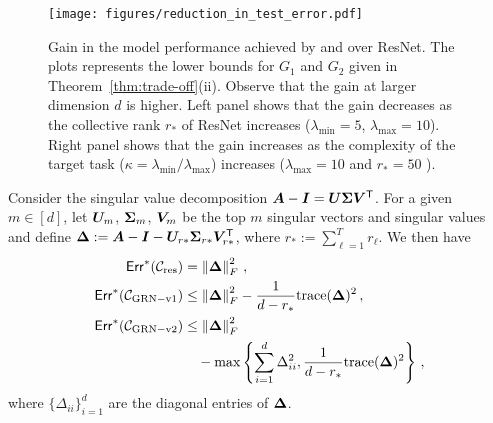  \begin{figure*}[t!]
    \centering
    \hspace{1cm} %
    \texttt{[image: figures/reduction\_in\_test\_error.pdf]}
    \vskip -0.1in
    \caption{Gain in the model performance achieved by \GenA{} and \GenB{} over ResNet. The plots represents the lower bounds for $G_1$ and $G_2$ given in Theorem~\ref{thm:trade-off}(ii). Observe that the gain at larger dimension $d$ is higher. Left panel shows that the gain decreases as the collective rank $r_*$ of ResNet increases ($\lambda_{\min}= 5$, $\lambda_{\max} = 10$). Right panel shows that the gain increases as the complexity of the target task ($\kappa= \lambda_{\min}/\lambda_{\max}$) increases ($\lambda_{\max}= 10$ and $r_* = 50$ ).}\label{fig:tradeoffs}
\end{figure*}

\begin{theorem}\label{thm:comp}
Consider the singular value decomposition ${\bm{A}}-\bm{I} = {\bm{U}}\boldsymbol{\Sigma} {\bm{V}}^{\sf T}$. For a given $m\in[d]$, let ${\bm{U}}_{m}$, $\boldsymbol{\Sigma}_m$, ${\bm{V}}_{m}$ be the top $m$ singular vectors and singular values and define $\bm{\Delta}: = {\bm{A}} -\bm{I}- {\bm{U}}_{r*}\boldsymbol{\Sigma}_{r*} {\bm{V}}_{r*}^{\sf T}$, where $r_*:=\sum_{\ell=1}^{T}r_\ell$.
We then have
\begin{align*}
    {\sf Err}^*(\mathcal{C}_{\rm res}) &= \left\|\bm{\Delta}\right\|_{F}^2\,,\\
    {\sf Err}^*(\mathcal{C}_{\rm GRN-v1{}}) &\le \left\|\bm{\Delta}\right\|_{F}^2 - \frac{1}{d-r_*}{{\operatorname{trace}}}(\bm{\Delta})^2\,,\\
    {\sf Err}^*(\mathcal{C}_{\rm GRN-v2{}}) &\le \left\|\bm{\Delta}\right\|_{F}^2\\
    &\quad-\max\left\{\sum_{i=1}^d  \Delta_{ii}^2, \frac{1}{d-r_*}{{\operatorname{trace}}}(\bm{\Delta})^2\right\}\,,
\end{align*}
where $\{\Delta_{ii}\}_{i=1}^d$ are the diagonal entries of $\bm{\Delta}$.
\end{theorem}
%

